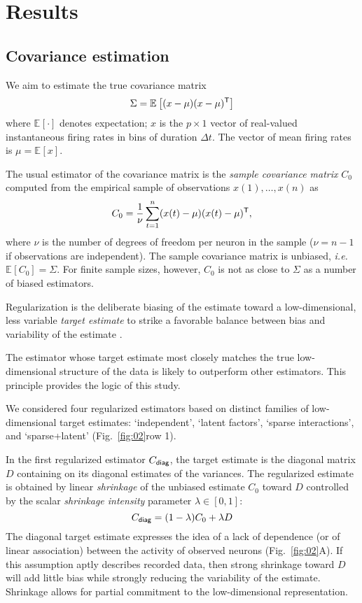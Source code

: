 \documentclass[10pt]{article}
\newcommand{\T}{{\sf T}}
\newcommand{\E}[2][]{\mathbb E_{#1}\left[ #2\right]}    %
\begin{document}
\section*{Results}

\subsection*{Covariance estimation}
We aim to estimate the true covariance matrix 
\begin{equation}\label{eq:true-covariance}
\Sigma = \E{(x-\mu)(x-\mu)^\T}
\end{equation}
where $\E{\cdot}$ denotes expectation; $x$ is the $p\times 1$ vector of real-valued instantaneous firing rates in bins of duration $\Delta t$. The vector of mean firing rates is $\mu = \E{x}$.  

The usual estimator of the covariance matrix is the \emph{sample covariance matrix} $C_0$ computed from the empirical sample of observations $x(1),\ldots,x(n)$ as
\begin{equation}
C_0 = \frac 1 \nu \sum\limits_{t=1}^n (x(t)-\mu)(x(t)-\mu)^\T, 
\end{equation}
where $\nu$ is the number of degrees of freedom per neuron in the sample ($\nu=n-1$ if observations are independent).  
The sample covariance matrix is unbiased, \emph{i.e.} $\E{C_0}=\Sigma$.
For finite sample sizes, however, $C_0$ is not as close to $\Sigma$ as a number of biased estimators.

Regularization is the deliberate biasing of the estimate toward a low-dimensional, less variable \emph{target estimate} to strike a favorable balance between bias and variability of the estimate \cite{Bickel:2006,Ledoit:2004}.  

The estimator whose target estimate most closely matches the true low-dimensional structure of the data is likely to outperform other estimators. This principle provides the logic of this study. 

We considered four regularized estimators based on distinct families of low-dimensional target estimates: `independent', `latent factors', `sparse interactions', and `sparse+latent' (Fig.~\ref{fig:02}\;row 1).  

In the first regularized estimator $C_{\sf diag}$, the target estimate is the diagonal matrix $D$ containing on its diagonal estimates of the variances.
The regularized estimate is obtained by linear \emph{shrinkage} of the unbiased estimate $C_0$ toward $D$ controlled by the scalar \emph{shrinkage intensity} parameter $\lambda \in [0, 1]$:
\begin{equation}
C_{\sf diag} = (1-\lambda) C_0 + \lambda D
\end{equation}
The diagonal target estimate expresses the idea of a lack of dependence (or of linear association) between the activity of observed neurons (Fig.~\ref{fig:02}\;A).  
If this assumption aptly describes recorded data, then strong shrinkage toward $D$ will add little bias while strongly reducing the variability of the estimate. Shrinkage allows for partial commitment to the low-dimensional representation.  
\end{document}
